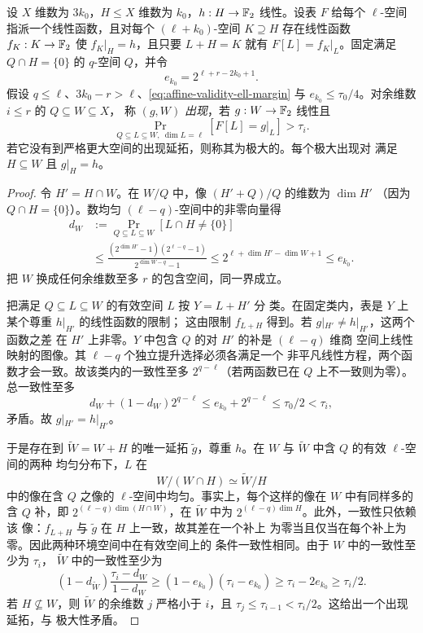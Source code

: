 \begin{lemma}[可容建议空间上的不变列表断言]
\label{lem:affine-validity-invariance}
设 $X$ 维数为 $3k_0$，$H\le X$ 维数为 $k_0$，$h:H\to\mathbb F_2$ 线性。设表
$F$ 给每个 $\ell$-空间指派一个线性函数，且对每个
$(\ell+k_0)$-空间 $K\supseteq H$ 存在线性函数 $f_K:K\to\mathbb F_2$ 使
$f_K|_H=h$，且只要 $L+H=K$ 就有 $F[L]=f_K|_L$。固定满足
$Q\cap H=\{0\}$ 的 $q$-空间 $Q$，并令
\[
  e_{k_0}=2^{\ell+r-2k_0+1}.
\]
假设 $q\le\ell$、$3k_0-r>\ell$、\eqref{eq:affine-validity-ell-margin}
与 $e_{k_0}\le\tau_0/4$。对余维数 $i\le r$ 的 $Q\subseteq W\subseteq X$，
称 $(g,W)$ \emph{出现}，若 $g:W\to\mathbb F_2$ 线性且
\[
  \Pr_{Q\subseteq L\subseteq W,\ \dim L=\ell}
       [F[L]=g|_L]>\tau_i.
\]
若它没有到严格更大空间的出现延拓，则称其为极大的。每个极大出现对
满足 $H\subseteq W$ 且 $g|_H=h$。
\end{lemma}

\begin{proof}
令 $H'=H\cap W$。在 $W/Q$ 中，像 $(H'+Q)/Q$ 的维数为 $\dim H'$
（因为 $Q\cap H=\{0\}$）。数均匀 $(\ell-q)$-空间中的非零向量得
\begin{align*}
 d_W&:=\Pr_{Q\subseteq L\subseteq W}[L\cap H\ne\{0\}]\\
 &\le
 \frac{(2^{\dim H'}-1)(2^{\ell-q}-1)}{2^{\dim W-q}-1}
 \le 2^{\ell+\dim H'-\dim W+1}
 \le e_{k_0}.
\end{align*}
把 $W$ 换成任何余维数至多 $r$ 的包含空间，同一界成立。

把满足 $Q\subseteq L\subseteq W$ 的有效空间 $L$ 按 $Y=L+H'$ 分
类。在固定类内，表是 $Y$ 上某个尊重 $h|_{H'}$ 的线性函数的限制；
这由限制 $f_{L+H}$ 得到。若 $g|_{H'}\ne h|_{H'}$，这两个函数之差
在 $H'$ 上非零。$Y$ 中包含 $Q$ 的对 $H'$ 的补是 $(\ell-q)$ 维商
空间上线性映射的图像。其 $\ell-q$ 个独立提升选择必须各满足一个
非平凡线性方程，两个函数才会一致。故该类内的一致性至多
$2^{q-\ell}$（若两函数已在 $Q$ 上不一致则为零）。总一致性至多
\[
  d_W+(1-d_W)2^{q-\ell}
  \le e_{k_0}+2^{q-\ell}\le\tau_0/2<\tau_i,
\]
矛盾。故 $g|_{H'}=h|_{H'}$。

于是存在到 $\widetilde W=W+H$ 的唯一延拓 $\widetilde g$，尊重
$h$。在 $W$ 与 $\widetilde W$ 中含 $Q$ 的有效 $\ell$-空间的两种
均匀分布下，$L$ 在
\[
  W/(W\cap H)\simeq\widetilde W/H
\]
中的像在含 $Q$ 之像的 $\ell$-空间中均匀。事实上，每个这样的像在
$W$ 中有同样多的含 $Q$ 补，即 $2^{(\ell-q)\dim(H\cap W)}$，在
$\widetilde W$ 中为 $2^{(\ell-q)\dim H}$。此外，一致性只依赖该
像：$f_{L+H}$ 与 $\widetilde g$ 在 $H$ 上一致，故其差在一个补上
为零当且仅当在每个补上为零。因此两种环境空间中在有效空间上的
条件一致性相同。由于 $W$ 中的一致性至少为 $\tau_i$，
$\widetilde W$ 中的一致性至少为
\[
  (1-d_{\widetilde W})\frac{\tau_i-d_W}{1-d_W}
  \ge(1-e_{k_0})(\tau_i-e_{k_0})
  \ge\tau_i-2e_{k_0}\ge\tau_i/2.
\]
若 $H\not\subseteq W$，则 $\widetilde W$ 的余维数 $j$ 严格小于
$i$，且 $\tau_j\le\tau_{i-1}<\tau_i/2$。这给出一个出现延拓，与
极大性矛盾。
\end{proof}

